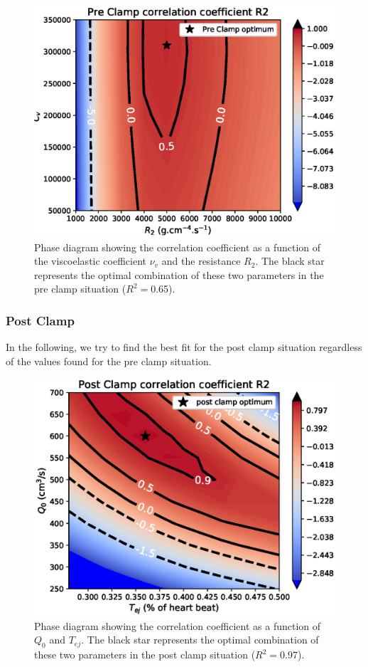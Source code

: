 \documentclass{config}
\begin{document}
\begin{figure}[H]
\centering
\includegraphics[scale=0.7]{Figures/preclamp_phase_diagram_nuv.eps}
\caption{Phase diagram showing the correlation coefficient as a function of the viscoelastic coefficient $\nu_v$ and the resistance $R_2$. The black star represents the optimal combination of these two parameters in the pre clamp situation ($R^2 = $0.65). }
\label{PD_preclamp_nu}
\end{figure}

\subsubsection{Post Clamp}

In the following, we try to find the best fit for the post clamp situation regardless of the values found for the pre clamp situation. 

\begin{figure}[H]
\centering
\includegraphics[scale=0.7]{Figures/postclamp_phase_diagram.eps}
\caption{Phase diagram showing the correlation coefficient as a function of $Q_0$ and $T_{ej}$. The black star represents the optimal combination of these two parameters in the post clamp situation ($R^2 = $0.97). }
\label{PD_postclamp}
\end{figure}
\end{document}
